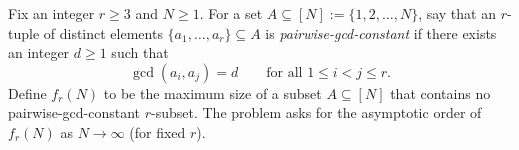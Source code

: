 Fix an integer $r\ge 3$ and $N\ge 1$. For a set $A\subseteq [N]:=\{1,2,\dots,N\}$, say that an $r$-tuple of distinct elements $\{a_1,\dots,a_r\}\subseteq A$ is \emph{pairwise-gcd-constant} if there exists an integer $d\ge 1$ such that
\[
\gcd(a_i,a_j)=d\qquad\text{for all }1\le i<j\le r.
\]
Define $f_r(N)$ to be the maximum size of a subset $A\subseteq [N]$ that contains no pairwise-gcd-constant $r$-subset. The problem asks for the asymptotic order of $f_r(N)$ as $N\to\infty$ (for fixed $r$).

